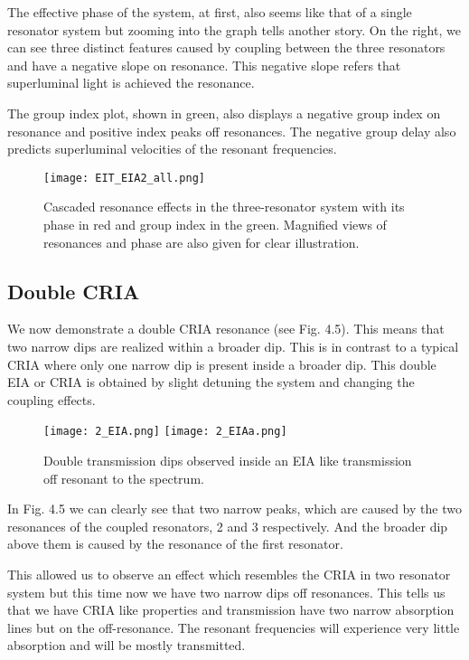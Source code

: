 The effective phase of the system, at first, also seems like that of a single resonator system but zooming into the graph tells another story. On the right, we can see three distinct features caused by coupling between the three resonators and have a negative slope on resonance. This negative slope refers that superluminal light is achieved the resonance.

The group index plot, shown in green, also displays a negative group index on resonance and positive index peaks off resonances. The negative group delay also predicts superluminal velocities of the resonant frequencies.
\newpage
\begin{figure}[h]
\centering
\texttt{[image: EIT\_EIA2\_all.png]}
\caption{Cascaded resonance effects in the three-resonator system with its phase in red and group index in the green. Magnified views of resonances and phase are also given for clear illustration.}
\end{figure}

\subsection{Double CRIA}
We now demonstrate a double CRIA resonance (see Fig. 4.5). This means that two narrow dips are realized within a broader dip. This is in contrast to a typical CRIA where only one narrow dip is present inside a broader dip. This double EIA or CRIA is obtained by slight detuning the system and changing the coupling effects. 


\begin{figure}[t]
\centering
\texttt{[image: 2\_EIA.png]}
\texttt{[image: 2\_EIAa.png]}
\caption{Double transmission dips observed inside an EIA like transmission off resonant to the spectrum.}
\end{figure}

In Fig. 4.5 we can clearly see that two narrow peaks, which are caused by the two resonances of the coupled resonators, 2 and 3 respectively. And the broader dip above them is caused by the resonance of the first resonator. 


This allowed us to observe an effect which resembles the CRIA in two resonator system but this time now we have two narrow dips off resonances. This tells us that we have CRIA like properties and transmission have two narrow absorption lines but on the off-resonance. The resonant frequencies will experience very little absorption and will be mostly transmitted. 

